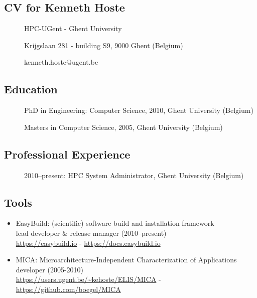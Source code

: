 
\subsection{CV for Kenneth Hoste}
\begin{description}
\item[] HPC-UGent - Ghent University
\item[] Krijgslaan 281 - building S9, 9000 Ghent (Belgium)
\item[] kenneth.hoste@ugent.be
\end{description}

\subsection*{Education}
\begin{description}
    \item[] PhD in Engineering: Computer Science, 2010, Ghent University (Belgium)
    \item[] Masters in Computer Science, 2005, Ghent University (Belgium)
\end{description}

\subsection*{Professional Experience}
\begin{description}
    \item[] 2010--present: HPC System Administrator, Ghent University (Belgium)
\end{description}

\subsection*{Tools}

\begin{itemize}
    \item[] EasyBuild: (scientific) software build and installation framework
    \\lead developer \& release manager (2010--present)
    \\{\small{\url{https://easybuild.io} - \url{https://docs.easybuild.io}}}
    \item[] MICA: Microarchitecture-Independent Characterization of Applications\\developer (2005-2010)\\{\small{\url{https://users.ugent.be/~kehoste/ELIS/MICA} - \url{https://github.com/boegel/MICA}}}
\end{itemize}

